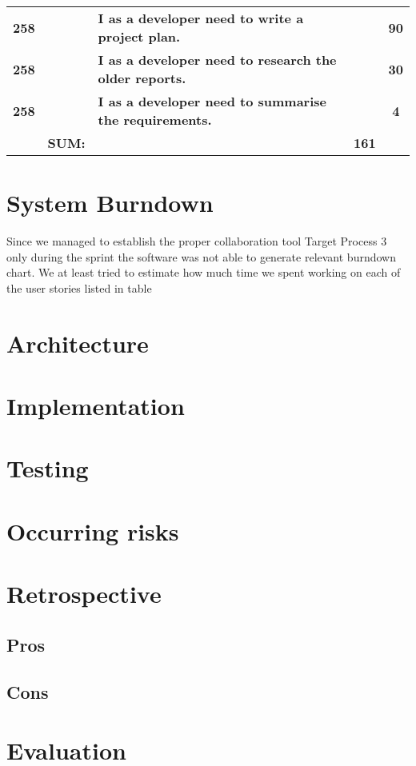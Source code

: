 \begin{table*}[!h]
\begin{tabularx}{\textwidth}{ccXcc}
\textbf{258} 	&
	& \textbf{I as a developer need to write a project plan.} 						&  			& \textbf{90} \\

\textbf{258} 	&
	& \textbf{I as a developer need to research the older reports.} 						&  			& \textbf{30} \\

\textbf{258} 	&
	& \textbf{I as a developer need to summarise the requirements.} 						&  			& \textbf{4} \\
\midrule
				& \textbf{SUM:}		&			& \textbf{161}
 \\																			
\bottomrule[1mm]

\end{tabularx}
\end{table*}

\section{System Burndown}
Since we managed to establish the proper collaboration tool Target Process 3 only during the sprint the software was not able to generate relevant burndown chart. We at least tried to estimate how much time we spent working on each of the user stories listed in table



\section{Architecture}
\section{Implementation}
\section{Testing}
\section{Occurring risks}
\section{Retrospective}
\subsection{Pros}
\subsection{Cons}
\section{Evaluation}